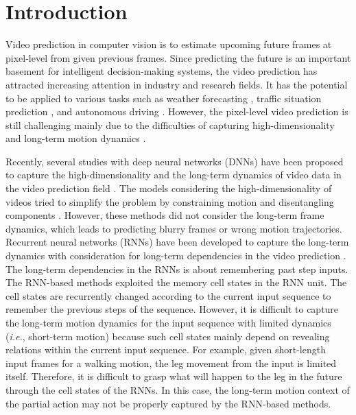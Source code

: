 \documentclass[final]{cvpr}
\begin{document}
\section{Introduction}
Video prediction in computer vision is to estimate upcoming future frames at pixel-level from given previous frames. Since predicting the future is an important basement for intelligent decision-making systems, the video prediction has attracted increasing attention in industry and research fields. It has the potential to be applied to various tasks such as weather forecasting \cite{xingjian2015convolutional}, traffic situation prediction \cite{chandra2019traphic}, and autonomous driving \cite{castrejon2019improved}. However, the pixel-level video prediction is still challenging mainly due to the difficulties of capturing high-dimensionality and long-term motion dynamics \cite{villegas2017learning, villegas2017decomposing, hsieh2018learning, wang2018eidetic}.

Recently, several studies with deep neural networks (DNNs) have been proposed to capture the high-dimensionality and the long-term dynamics of video data in the video prediction field \cite{finn2016unsupervised, villegas2017decomposing, hsieh2018learning, villegas2017learning, wang2018predrnn++, wang2018eidetic, su2020convolutional}. The models considering the high-dimensionality of videos tried to simplify the problem by constraining motion and disentangling components \cite{finn2016unsupervised, villegas2017decomposing,hsieh2018learning}. However, these methods did not consider the long-term frame dynamics, which leads to predicting blurry frames or wrong motion trajectories. Recurrent neural networks (RNNs) have been developed to capture the long-term dynamics with consideration for long-term dependencies in the video prediction \cite{villegas2017learning, wang2018predrnn++, wang2018eidetic}. The long-term dependencies in the RNNs is about remembering past step inputs. The RNN-based methods exploited the memory cell states in the RNN unit. The cell states are recurrently changed according to the current input sequence to remember the previous steps of the sequence. However, it is difficult to capture the long-term motion dynamics for the input sequence with limited dynamics (\textit{i.e.}, short-term motion) because such cell states mainly depend on revealing relations within the current input sequence. For example, given short-length input frames for a walking motion, the leg movement from the input is limited itself. Therefore, it is difficult to grasp what will happen to the leg in the future through the cell states of the RNNs. In this case, the long-term motion context of the partial action may not be properly captured by the RNN-based methods.
\end{document}
